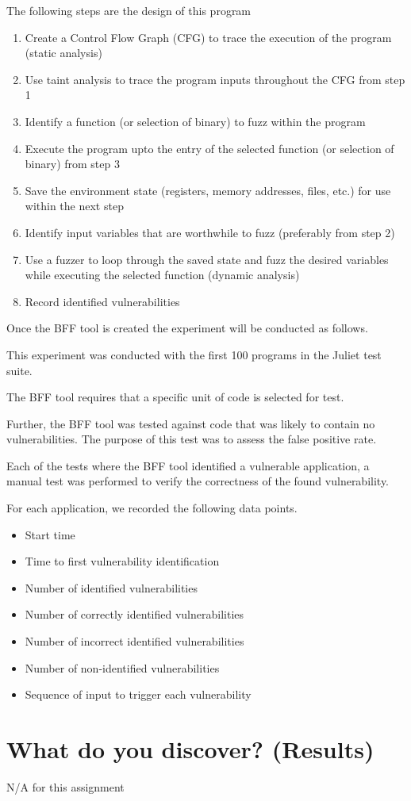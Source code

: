\documentclass[conference]{IEEEtran}
\begin{document}
The following steps are the design of this program
\begin{enumerate}
\item Create a Control Flow Graph (CFG) to trace the execution of the program (static analysis)
\item Use taint analysis to trace the program inputs throughout the CFG from step 1
\item Identify a function (or selection of binary) to fuzz within the program
\item Execute the program upto the entry of the selected function (or selection of binary) from step 3 
\item Save the environment state (registers, memory addresses, files, etc.) for use within the next step
\item Identify input variables that are worthwhile to fuzz (preferably from step 2)
\item Use a fuzzer to loop through the saved state and fuzz the desired variables while executing the selected function (dynamic analysis)
\item Record identified vulnerabilities
\end{enumerate}

Once the BFF tool is created the experiment will be conducted as follows. 

This experiment was conducted with the first 100 programs in the Juliet test suite.

The BFF tool requires that a specific unit of code is selected for test. 

Further, the BFF tool was tested against code that was likely to contain no vulnerabilities. The purpose of this test was to assess the false positive rate.

Each of the tests where the BFF tool identified a vulnerable application, a manual test was performed to verify the correctness of the found vulnerability.

For each application, we recorded the following data points.
\begin{itemize}
\item Start time
\item Time to first vulnerability identification
\item Number of identified vulnerabilities
\item Number of correctly identified vulnerabilities
\item Number of incorrect identified vulnerabilities
\item Number of non-identified vulnerabilities
\item Sequence of input to trigger each vulnerability
\end{itemize}


\section{What do you discover? (Results)}
N/A for this assignment

\nocite{*}


\end{document}
